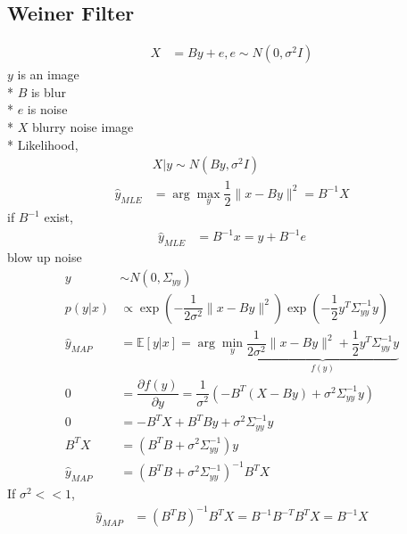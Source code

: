 \documentclass{article}
\begin{document}
\subsection{Weiner Filter}
\begin{align*}
X  &= B y + e, e \sim  N\left(0, \sigma^{2} I\right)
\end{align*}
$y $ is an image
\\* $B $ is blur
\\* $e $ is noise
\\* $X $ blurry noise image
\\* Likelihood,
\begin{align*}
&X  | y \sim  N\left(B y, \sigma^{2} I\right)
\\ \hat{y}_{MLE} &= \arg\displaystyle\max_{y} \dfrac{1}{2} \| x - B y \|^{2} = B^{-1} X 
\end{align*}
if $B^{-1}$ exist,
\begin{align*}
\hat{y}_{MLE} &= B^{-1} x = y + B^{-1} e 
\end{align*}
blow up noise
\begin{align*}
y  &  \sim  N\left(0, \Sigma_{yy}\right)
\\ p\left(y | x\right)  &  \propto \exp\left(- \dfrac{1}{2 \sigma^{2}} \| x - B y \|^{2}\right) \exp\left(- \dfrac{1}{2} y^{T} \Sigma^{-1}_{yy} y \right)
\\ \hat{y}_{MAP} &= \mathbb{E}\left[y | x\right] = \arg\displaystyle\min_{y} \underbrace{\dfrac{1}{2 \sigma^{2}} \| x - B y \|^{2} + \dfrac{1}{2} y^{T} \Sigma^{-1}_{yy} y}_{f\left(y\right)}
\\ 0 &= \dfrac{\partial f\left(y\right)}{\partial y} = \dfrac{1}{\sigma^{2}} \left(- B^{T} \left(X - B y\right) + \sigma^{2} \Sigma^{-1}_{yy} y \right)
\\ 0 &= - B^{T} X + B^{T} B y + \sigma^{2} \Sigma^{-1}_{yy} y 
\\ B^{T} X &= \left(B^{T} B + \sigma^{2} \Sigma^{-1}_{yy}\right) y 
\\ \hat{y}_{MAP} &= \left(B^{T} B + \sigma^{2} \Sigma^{-1}_{yy}\right)^{-1} B^{T} X 
\end{align*}
If $\sigma^{2} << 1$,
\begin{align*}
\hat{y}_{MAP} &= \left(B^{T} B\right)^{-1} B^{T} X = B^{-1} B^{-T} B^{T} X = B^{-1} X 
\end{align*}
\end{document}
